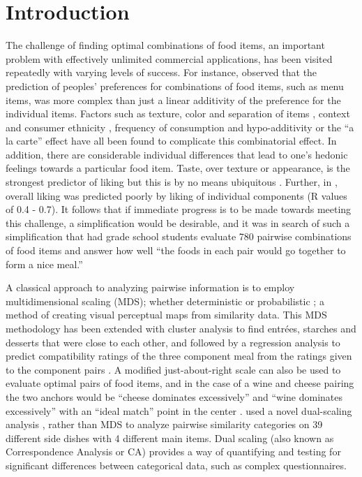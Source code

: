 \section{Introduction}
The challenge of finding optimal combinations of food items, an important problem with effectively unlimited commercial applications, has been visited repeatedly with varying levels of success.  For instance, \citet{Eindhoven1959} observed that the prediction of peoples’ preferences for combinations of food items, such as menu items, was more complex than just a linear additivity of the preference for the individual items.  Factors such as texture, color and separation of items \citep{Eindhoven1959,Pilgrim1961}, context and consumer ethnicity \citep{Marshall2003,Niewind1986}, frequency of consumption \citep{Marshall2003} and hypo-additivity or the “a la carte” effect \citep{Lawless1994} have all been found to complicate this combinatorial effect.  In addition, there are considerable individual differences that lead to one’s hedonic feelings towards a particular food item.  Taste, over texture or appearance, is the strongest predictor of liking but this is by no means ubiquitous \citep{Moskowitz1995}.   Further, in \citet{Moskowitz1995}, overall liking was predicted poorly by liking of individual components (R values of 0.4 - 0.7).  It follows that if immediate progress is to be made towards meeting this challenge, a simplification would be desirable, and it was in search of such a simplification that \citet{Worsley1984} had grade school students evaluate 780 pairwise combinations of food items and answer how well “the foods in each pair would go together to form a nice meal.”  

A classical approach to analyzing pairwise information is to employ multidimensional scaling (MDS); whether deterministic \citep{Schiffman1981} or probabilistic \citep{Ennis1988}; a method of creating visual perceptual maps from similarity data.  This MDS methodology has been extended with cluster analysis to find entr\'{e}es, starches and desserts that were close to each other, and followed by a regression analysis to predict compatibility ratings of the three component meal from the ratings given to the component pairs \citep{Klarman1977}.  A modified just-about-right scale \citep{Johnson1987} can also be used to evaluate optimal pairs of food items, and in the case of a wine and cheese pairing the two anchors would be “cheese dominates excessively” and “wine dominates excessively” with an “ideal match” point in the center \citep{King2005}.  \citet{Niewind1986} used a novel dual-scaling analysis \citep{Nishisato1984}, rather than MDS to analyze pairwise similarity categories on 39 different side dishes with 4 different main items.  Dual scaling (also known as Correspondence Analysis or CA) provides a way of quantifying and testing for significant differences between categorical data, such as complex questionnaires.

